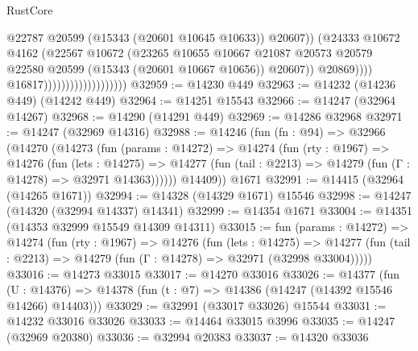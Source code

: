 \begin{lexlean}{RustCore}
\begin{coremodule}
                                                    @22787
                                                    @20599
                                                    (@15343 (@20601 @10645 @10633))
                                                    @20607))
                                                (@24333
                                                  @10672
                                                  @4162
                                                  (@22567
                                                    @10672
                                                    (@23265
                                                      @10655
                                                      @10667
                                                      @21087
                                                      @20573
                                                      @20579
                                                      @22580
                                                      @20599
                                                      (@15343 (@20601 @10667 @10656))
                                                      @20607))
                                                  @20869))))
                                          @16817)))))))))))))))))))
@32959 := @14230 @449
@32963 := @14232 (@14236 @449) (@14242 @449)
@32964 := @14251 @15543
@32966 := @14247 (@32964 @14267)
@32968 := @14290 (@14291 @449)
@32969 := @14286 @32968
@32971 := @14247 (@32969 @14316)
@32988 := @14246
    (fun (fn : @94) =>
    @32966
      (@14270
        (@14273
          (fun (params : @14272) =>
          @14274
            (fun (rty : @1967) =>
            @14276
              (fun (lets : @14275) =>
              @14277 (fun (tail : @2213) => @14279 (fun (Γ : @14278) => @32971 @14363))))))
        @14409))
    @1671
@32991 := @14415 (@32964 (@14265 @1671))
@32994 := @14328 (@14329 @1671) @15546
@32998 := @14247 (@14320 (@32994 @14337) @14341)
@32999 := @14354 @1671
@33004 := @14351 (@14353 @32999 @15549 @14309 @14311)
@33015 := fun (params : @14272) =>
  @14274
    (fun (rty : @1967) =>
    @14276
      (fun (lets : @14275) =>
      @14277 (fun (tail : @2213) => @14279 (fun (Γ : @14278) => @32971 (@32998 @33004)))))
@33016 := @14273 @33015
@33017 := @14270 @33016
@33026 := @14377
    (fun (U : @14376) => @14378 (fun (t : @7) => @14386 (@14247 (@14392 @15546 @14266) @14403)))
@33029 := @32991 (@33017 @33026) @15544
@33031 := @14232 @33016 @33026
@33033 := @14464 @33015 @3996
@33035 := @14247 (@32969 @20380)
@33036 := @32994 @20383
@33037 := @14320 @33036

\end{coremodule}
\end{lexlean}

